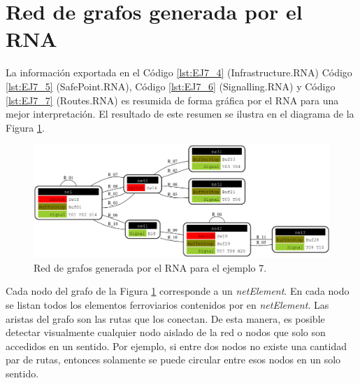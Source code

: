 \section{Red de grafos generada por el RNA}

	La información exportada en el Código \ref{lst:EJ7_4} (Infrastructure.RNA) Código \ref{lst:EJ7_5} (SafePoint.RNA), Código \ref{lst:EJ7_6} (Signalling.RNA) y Código \ref{lst:EJ7_7} (Routes.RNA) es resumida de forma gráfica por el RNA para una mejor interpretación. El resultado de este resumen se ilustra en el diagrama de la Figura \ref{fig:EJ7_8}.

	\begin{figure}[H]
		\centering
		\includegraphics[width=1\textwidth]{Figuras/Graph_7}
		\centering\caption{Red de grafos generada por el RNA para el ejemplo 7.}
		\label{fig:EJ7_8}
	\end{figure}
	
	Cada nodo del grafo de la Figura \ref{fig:EJ7_8} corresponde a un \textit{netElement}. En cada nodo se listan todos los elementos ferroviarios contenidos por en \textit{netElement}. Las aristas del grafo son las rutas que los conectan. De esta manera, es posible detectar visualmente cualquier nodo aislado de la red o nodos que solo son accedidos en un sentido. Por ejemplo, si entre dos nodos no existe una cantidad par de rutas, entonces solamente se puede circular entre esos nodos en un solo sentido.